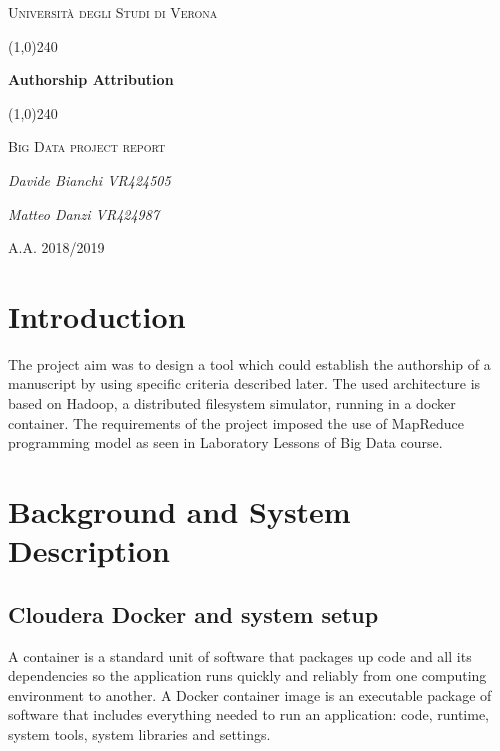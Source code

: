 \documentclass[a4paper,11pt, twoside, openright]{article}
\begin{document}
	\clearpage
	\begin{titlepage}
		\centering
		\vspace*{\fill}
		{\scshape\LARGE Università degli Studi di Verona \par}
		\vspace{1.5cm}
		\line(1,0){240} \\
		{\huge\bfseries Authorship Attribution\par}
		\line(1,0){240} \\
		\vspace{0.5cm}
		{\scshape\Large Big Data project report\par}
		\vspace{2cm}
		{\Large\itshape Davide Bianchi VR424505\par
		\Large\itshape Matteo Danzi VR424987\par}
		\vspace{1cm}
		\vspace{5cm}
		\vspace*{\fill}
		{\large A.A. 2018/2019\par}
	\end{titlepage}
	\thispagestyle{empty}
	\newpage
	\tableofcontents
	\newpage
	
	\section{Introduction}
	The project aim was to design a tool which could establish the authorship of a manuscript by using specific criteria described later. 
	The used architecture is based on Hadoop, a distributed filesystem simulator, running in a docker container. The requirements of the project imposed the use of MapReduce programming model as seen in Laboratory Lessons of Big Data course.

	\section{Background and System Description}

    \subsection{Cloudera Docker and system setup}
		A container is a standard unit of software that packages up code and all its dependencies so the application runs quickly and reliably from one computing environment to another. A Docker container image is an executable package of software that includes everything needed to run an application: code, runtime, system tools, system libraries and settings.
\end{document}
